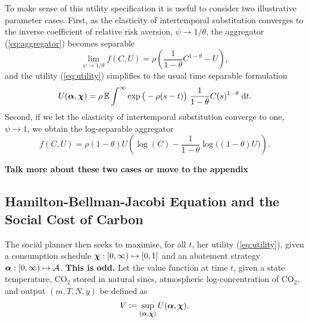 \documentclass[../../main.tex]{subfiles}
\begin{document}
To make sense of this utility specification it is useful to consider two illustrative parameter cases. First, as the elasticity of intertemporal substitution converges to the inverse  coefficient of relative risk aversion, $\psi \to 1 / \theta$, the aggregator (\ref{eq:aggregator}) becomes separable \begin{equation}
    \lim_{\psi \to 1 / \theta} f(C, U) = \rho \left(\frac{1}{1 - \theta} C^{1 - \theta} - U\right),
\end{equation} and the utility (\ref{eq:utility}) simplifies to the usual time separable formulation \begin{equation}
    U(\bm{\alpha}, \bm{\chi}) = \rho\operatorname{\mathbb{E}} \int^{\infty} \exp\big(-\rho (s - t) \big) \; \frac{1}{1 - \theta} C(s)^{1 - \theta} \; \mathrm{d}t.
\end{equation} Second, if we let the elasticity of intertemporal substitution converge to one, $\psi \to 1$, we obtain the log-separable aggregator \begin{equation}
    f(C, U) = \rho (1 - \theta)U \left(\log(C) - \frac{1}{1 - \theta} \log\big( (1 - \theta) U \big) \right).
\end{equation}

\textbf{Talk more about these two cases or move to the appendix}

\subsection{Hamilton-Bellman-Jacobi Equation and the Social Cost of Carbon}

The social planner then seeks to maximise, for all $t$, her utility (\ref{eq:utility}), given a consumption schedule $\bm{\chi}: [0, \infty) \mapsto \mathcal [0, 1]$ and an abatement strategy $\bm{\alpha}: [0, \infty) \mapsto \mathcal{A}$. \textbf{This is odd.} Let the value function at time $t$, given a state temperature, CO$_2$ stored in natural sincs, atmospheric log-concentration of CO$_2$, and output $(m, T, N, y)$ be defined as \begin{equation}
    V \coloneqq \sup_{(\bm{\alpha}, \bm{\chi})} U(\bm{\alpha}, \bm{\chi}).
\end{equation}
\end{document}
